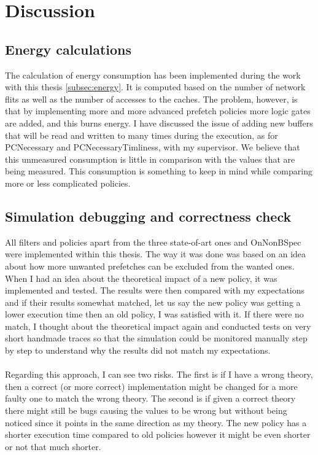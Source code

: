 \chapter{Discussion}
\label{chap:discussion}

\section{Energy calculations }
 The calculation of energy consumption has been implemented during the work with this thesis \ref{subsec:energy}. It is computed based on the number of network flits as well as the
number of accesses to the caches. The problem, however, is that by implementing
more and more advanced prefetch policies more logic gates are added, and this burns
energy. I have discussed the issue of adding new buffers that will be read and written
to many times during the execution, as for PCNecessary and PCNecessaryTimliness,
with my supervisor. We believe that this unmeasured consumption is little in comparison with the values that are being measured. This consumption is something to
keep in mind while comparing more or less complicated policies.

\section{Simulation debugging and correctness check }
All filters and policies apart from the three state-of-art ones and OnNonBSpec were
implemented within this thesis. The way it was done was based on an idea about
how more unwanted prefetches can be excluded from the wanted ones. When I had an idea about the theoretical impact of a new policy, it was implemented and tested. The results were then compared with my expectations and if their results somewhat matched, let us say the new policy was getting a lower execution time then an old policy, I was satisfied with it. If there were no match, I thought about the theoretical
impact again and conducted tests on very short handmade traces so that the simulation could be monitored manually step by step to understand why the results did
not match my expectations.
 \\ \\
Regarding this approach, I can see two risks. The first is if I have a wrong theory, then a correct (or more correct) implementation might be changed for a more faulty one to match the wrong theory. The second is if given a correct theory there might still be bugs causing the values to be wrong but without being noticed since it points in the same direction as my theory. The new policy has a shorter execution time compared to old policies however it might be even shorter or not that much shorter.